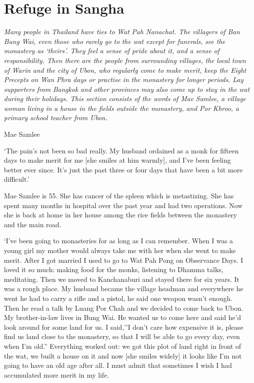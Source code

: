 

\chapter{Refuge in Sangha}
\markright{\chapterAuthor}

\emph{Many people in Thailand have ties to Wat Pah Nanachat. The
villagers of Ban Bung Wai, even those who rarely go to the wat except
for funerals, see the monastery as `theirs'. They feel a sense of pride
about it, and a sense of responsibility. Then there are the people from
surrounding villages, the local town of Warin and the city of Ubon, who
regularly come to make merit, keep the Eight Precepts on Wan Phra days
or practise in the monastery for longer periods. Lay supporters from
Bangkok and other provinces may also come up to stay in the wat during
their holidays. This section consists of the words of Mae Samlee, a
village woman living in a house in the fields outside the monastery, and
Por Khroo, a primary school teacher from Ubon.}

Mae Samlee

`The pain's not been so bad really. My husband ordained as a monk for
fifteen days to make merit for me {[}she smiles at him warmly{]}, and
I've been feeling better ever since. It's just the past three or four
days that have been a bit more difficult.'

Mae Samlee is 55. She has cancer of the spleen which is metastizing. She
has spent many months in hospital over the past year and had two
operations. Now she is back at home in her house among the rice fields
between the monastery and the main road.

`I've been going to monasteries for as long as I can remember. When I
was a young girl my mother would always take me with her when she went
to make merit. After I got married I used to go to Wat Pah Pong on
Observance Days. I loved it so much: making food for the monks,
listening to Dhamma talks, meditating. Then we moved to Kanchanaburi and
stayed there for six years. It was a rough place. My husband became the
village headman and everywhere he went he had to carry a rifle and a
pistol, he said one weapon wasn't enough. Then he read a talk by Luang
Por Chah and we decided to come back to Ubon. My brother-in-law lives in
Bung Wai. He wanted us to come here and said he'd look around for some
land for us. I said,''I don't care how expensive it is, please find us
land close to the monastery, so that I will be able to go every day,
even when I'm old.'' Everything worked out: we got this plot of land
right in front of the wat, we built a house on it and now {[}she smiles
widely{]} it looks like I'm not going to have an old age after all. I
must admit that sometimes I wish I had accumulated more merit in my
life.

